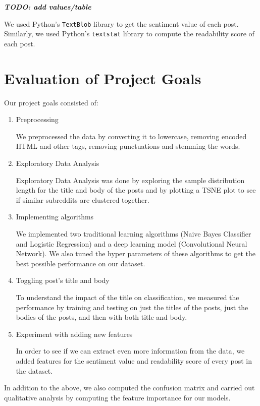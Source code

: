 \documentclass{sig-alternate-05-2015}
\begin{document}
\textit{\textbf{TODO: add values/table}}

We used Python's \verb+TextBlob+\cite{textblob} library to get the sentiment value of each post. Similarly, we used Python's \verb+textstat+\cite{textstat} library to compute the readability score of each post.

\section{Evaluation of Project Goals}

Our project goals consisted of:
\begin{enumerate}
    \item Preprocessing
            
            We preprocessed the data by converting it to lowercase, removing encoded HTML and other tags, removing punctuations and stemming the words.
    \item Exploratory Data Analysis 
            
            Exploratory Data Analysis was done by exploring the sample distribution length for the title and body of the posts and by plotting a TSNE plot to see if similar subreddits are clustered together.
    \item Implementing algorithms
            
            We implemented two traditional learning algorithms (Naive Bayes Classifier and Logistic Regression) and a deep learning model (Convolutional Neural Network). We also tuned the hyper parameters of these algorithms to get the best possible performance on our dataset.
    \item Toggling post's title and body
            
            To understand the impact of the title on classification, we measured the performance by training and testing on just the titles of the posts, just the bodies of the posts, and then with both title and body.
    \item Experiment with adding new features
            
            In order to see if we can extract even more information from the data, we added features for the sentiment value and readability score of every post in the dataset. 
            
\end{enumerate}

In addition to the above, we also computed the confusion matrix and carried out qualitative analysis by computing the feature importance for our models.
\end{document}

